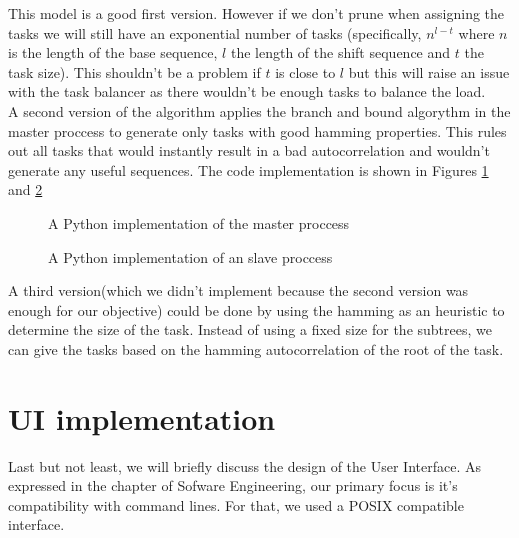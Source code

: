   This model is a good first version. However if we don't prune when assigning
  the tasks we will still have an exponential number of tasks (specifically,
  $n^{l-t}$ where $n$ is the length of the base sequence, $l$ the length of
  the shift sequence and $t$ the task size). This shouldn't be a problem if
  $t$ is close to $l$ but this will raise an issue with the task balancer as
  there wouldn't be enough tasks to balance the load.\\

  A second version of the algorithm applies the branch and bound algorythm in
  the master proccess to generate only tasks with good hamming properties.
  This rules out all tasks that would instantly result in a bad
  autocorrelation and wouldn't generate any useful sequences. The code
  implementation is shown in Figures \ref{parallelism_example:fig:1} and
  \ref{parallelism_example:fig:2}\\

  \begin{figure}[ht!]
    \caption{A Python implementation of the master proccess}
    \label{parallelism_example:fig:1}
  \end{figure}

  \begin{figure}[ht!]
    \caption{A Python implementation of an slave proccess}
    \label{parallelism_example:fig:2}
  \end{figure}

  A third version(which we didn't implement because the second version was
  enough for our objective) could be done by using the hamming as an
  heuristic to determine the size of the task. Instead of using a fixed size
  for the subtrees, we can give the tasks based on the hamming
  autocorrelation of the root of the task.\\

  \section{UI implementation}

  Last but not least, we will briefly discuss the design of the User Interface.
  As expressed in the chapter of Sofware Engineering, our primary focus is
  it's compatibility with command lines. For that, we used a POSIX compatible
  interface.\\

